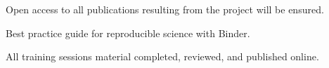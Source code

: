 \begin{workpackage}
\begin{wpdescription}
  Open access to all publications resulting from the project will be ensured.
\end{wpdescription}

\begin{tasklist}



\end{tasklist}

\begin{wpdelivs}
  \begin{wpdeliv}[due=24,id=best-practice-guide,dissem=PU,miles=prototype,nature=R,lead=UIO]
  {Best practice guide for reproducible science with Binder.}
\end{wpdeliv}
\begin{wpdeliv}[due=36,id=education-materials2,dissem=PU,miles=final,nature=R,lead=UIO]
  {All training sessions material completed, reviewed, and published online.}
\end{wpdeliv}
\end{wpdelivs}

\end{workpackage}

